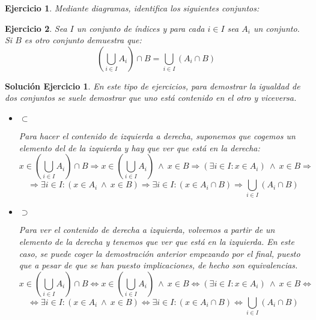 \documentclass[10pt,a4paper,openright]{book}
\newtheorem{ej}{Ejercicio}
\newtheorem{sol}{Solución Ejercicio}
\begin{document}
\begin{ej}
Mediante diagramas, identifica los siguientes conjuntos:
\end{ej}

\begin{ej}
Sea $I$ un conjunto de índices y para cada $i \in I$ sea $A_i$ un conjunto. Si $B$ es otro conjunto demuestra que:
$$\left(\bigcup_{i\in I} A_i\right) \cap B = \bigcup_{i\in I} (A_i\cap B)$$
\end{ej}
\begin{sol}
En este tipo de ejercicios, para demostrar la igualdad de dos conjuntos se suele demostrar que uno está contenido en el otro y viceversa.
\begin{itemize}
\item $\subset$

Para hacer el contenido de izquierda a derecha, suponemos que cogemos un elemento del de la izquierda y hay que ver que está en la derecha:
$$x\in \left(\bigcup_{i\in I} A_i\right) \cap B \Rightarrow x \in \left(\bigcup_{i\in I} A_i\right) \ \wedge \ x \in B \Rightarrow (\exists i  \in I : x\in A_i) \ \wedge \ x\in B \Rightarrow $$
$$\Rightarrow \exists i \in I : (x\in A_i \ \wedge \ x\in B) \Rightarrow \exists i \in I : (x\in A_i \cap B) \Rightarrow \bigcup_{i\in I}(A_i\cap B)$$

\item $\supset$

Para ver el contenido de derecha a izquierda, volvemos a partir de un elemento de la derecha y tenemos que ver que está en la izquierda. En este caso, se puede coger la demostración anterior empezando por el final, puesto que a pesar de que se han puesto implicaciones, de hecho son equivalencias.
$$x\in \left(\bigcup_{i\in I} A_i\right) \cap B \Leftrightarrow x \in \left(\bigcup_{i\in I} A_i\right) \ \wedge \ x \in B \Leftrightarrow (\exists i  \in I : x\in A_i) \ \wedge \ x\in B \Leftrightarrow $$
$$\Leftrightarrow \exists i \in I : (x\in A_i \ \wedge \ x\in B) \Leftrightarrow \exists i \in I : (x\in A_i \cap B) \Leftrightarrow \bigcup_{i\in I}(A_i\cap B)$$
\end{itemize}
\end{sol}
\end{document}
